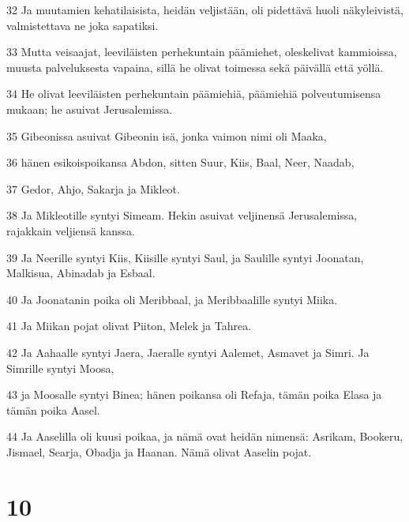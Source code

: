\par 32 Ja muutamien kehatilaisista, heidän veljistään, oli pidettävä huoli näkyleivistä, valmistettava ne joka sapatiksi.
\par 33 Mutta veisaajat, leeviläisten perhekuntain päämiehet, oleskelivat kammioissa, muusta palveluksesta vapaina, sillä he olivat toimessa sekä päivällä että yöllä.
\par 34 He olivat leeviläisten perhekuntain päämiehiä, päämiehiä polveutumisensa mukaan; he asuivat Jerusalemissa.
\par 35 Gibeonissa asuivat Gibeonin isä, jonka vaimon nimi oli Maaka,
\par 36 hänen esikoispoikansa Abdon, sitten Suur, Kiis, Baal, Neer, Naadab,
\par 37 Gedor, Ahjo, Sakarja ja Mikleot.
\par 38 Ja Mikleotille syntyi Simeam. Hekin asuivat veljinensä Jerusalemissa, rajakkain veljiensä kanssa.
\par 39 Ja Neerille syntyi Kiis, Kiisille syntyi Saul, ja Saulille syntyi Joonatan, Malkisua, Abinadab ja Esbaal.
\par 40 Ja Joonatanin poika oli Meribbaal, ja Meribbaalille syntyi Miika.
\par 41 Ja Miikan pojat olivat Piiton, Melek ja Tahrea.
\par 42 Ja Aahaalle syntyi Jaera, Jaeralle syntyi Aalemet, Asmavet ja Simri. Ja Simrille syntyi Moosa,
\par 43 ja Moosalle syntyi Binea; hänen poikansa oli Refaja, tämän poika Elasa ja tämän poika Aasel.
\par 44 Ja Aaselilla oli kuusi poikaa, ja nämä ovat heidän nimensä: Asrikam, Bookeru, Jismael, Searja, Obadja ja Haanan. Nämä olivat Aaselin pojat.

\chapter{10}

